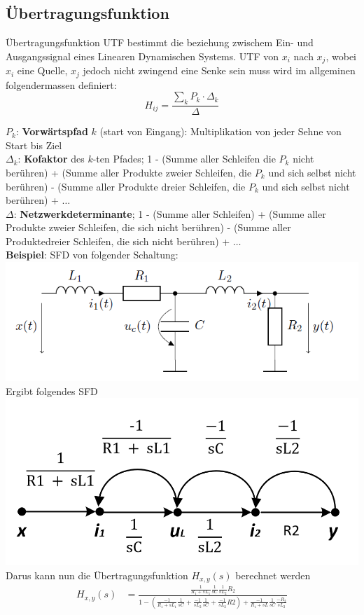 \subsection{Übertragungsfunktion}
Übertragungsfunktion UTF bestimmt die beziehung zwischem Ein- und Ausgangssignal eines Linearen Dynamischen Systems. UTF von $x_i$ nach $x_j$, wobei $x_i$ eine Quelle, $x_j$ jedoch nicht zwingend eine Senke sein muss wird im allgeminen folgendermassen definiert:
\[
H_{ij} = \frac{\sum_{k} P_{k}\cdot \Delta_k}{\Delta}
\]

\noindent$P_k$: \textbf{Vorwärtspfad} $k$ (start von Eingang): Multiplikation von jeder Sehne von Start bis Ziel\\
$\Delta_k$: \textbf{Kofaktor} des $k$-ten Pfades; 1 - (Summe aller Schleifen die $P_k$ nicht berühren) + (Summe aller Produkte zweier Schleifen, die $P_k$ und sich selbst nicht berühren) - (Summe aller Produkte dreier Schleifen, die $P_k$ und sich selbst nicht berühren) + $\dots$\\
$\Delta$: \textbf{Netzwerkdeterminante}; 1 - (Summe aller Schleifen) + (Summe aller Produkte zweier Schleifen, die sich nicht berühren) - (Summe aller Produktedreier Schleifen, die sich nicht berühren) + $\dots$\\

\noindent\textbf{Beispiel}:
SFD von folgender Schaltung:\\
\includegraphics[width=\columnwidth]{Images/sfd_beispiel_adv}
Ergibt folgendes SFD\\
\includegraphics[width=\columnwidth]{Images/sfd_beispiel_adv1}
Darus kann nun die Übertragungsfunktion $H_{x,y}(s)$ berechnet werden
\begin{align*}
	H_{x,y}(s) &= \frac{\frac{1}{R_1+sL_1} \frac{1}{sC}\frac{1}{sL_2}R_2}{1-\left(\frac{-1}{R_1+sL_1}\frac{1}{sC}+\frac{-1}{sL_2}\frac{1}{sC}+\frac{-1}{sL_2}R2\right)+\frac{-1}{R_1+sL}\frac{1}{sC}\frac{-R_2}{sL_2}}
\end{align*}

